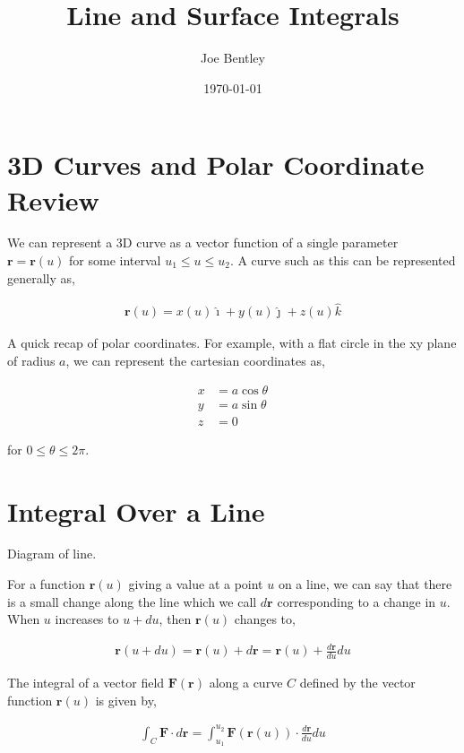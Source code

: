 \documentclass[11pt]{amsart}
\title{Line and Surface Integrals}
\author{Joe Bentley}
\date{\today}
\begin{document}
\maketitle

\newpage

\section{3D Curves and Polar Coordinate Review}

We can represent a 3D curve as a vector function of a single parameter $\mathbf{r} = \mathbf{r}(u)$ for some interval $u_1 \leq u \leq u_2$. A curve such as this can be represented generally as,

\begin{align*}
  \mathbf{r}(u) = x(u)\hat{\imath} + y(u)\hat{\jmath} + z(u)\hat{k}
\end{align*}

A quick recap of polar coordinates. For example, with a flat circle in the xy plane of radius $a$, we can represent the cartesian coordinates as,

\begin{align*}
  x &= a\cos{\theta} \\
  y &= a\sin{\theta} \\
  z &= 0
\end{align*}

for $0 \leq \theta \leq 2\pi$.

\section{Integral Over a Line}

Diagram of line.

For a function $\mathbf{r}(u)$ giving a value at a point $u$ on a line, we can say that there is a small change along the line which we call $d\mathbf{r}$ corresponding to a change in $u$. When $u$ increases to $u + du$, then $\mathbf{r}(u)$ changes to,

\begin{align*}
  \mathbf{r}(u + du) = \mathbf{r}(u) + d\mathbf{r} = \mathbf{r}(u) + \frac{d\mathbf{r}}{du} du
\end{align*}

The integral of a vector field $\mathbf{F}(\mathbf{r})$ along a curve $C$ defined by the vector function $\mathbf{r}(u)$ is given by,

\begin{align*}
  \int_C \mathbf{F}\cdot d\mathbf{r} = \int_{u_1}^{u_2} \mathbf{F}(\mathbf{r}(u)) \cdot \frac{d\mathbf{r}}{du} du
\end{align*}
\end{document}
